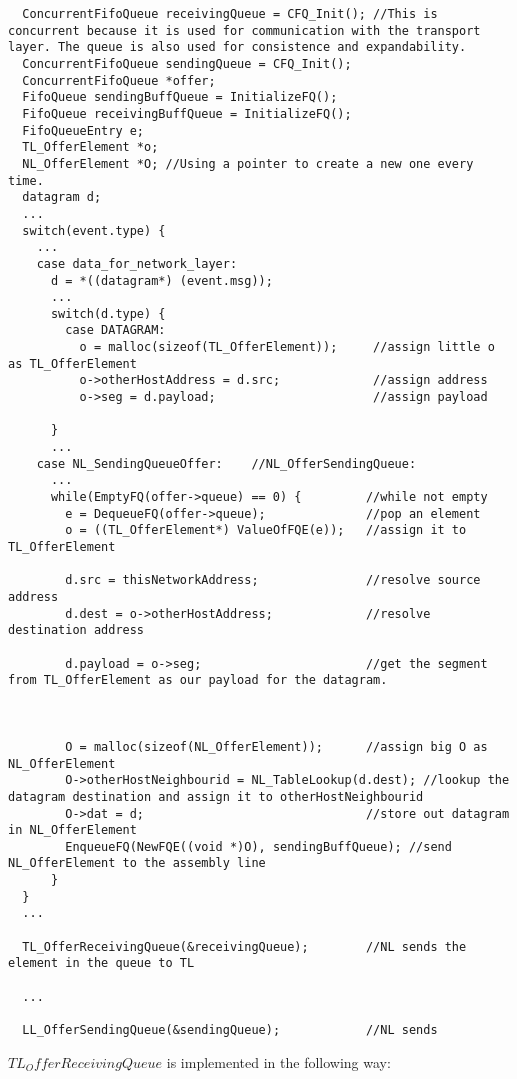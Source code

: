 \begin{lstlisting}
  ConcurrentFifoQueue receivingQueue = CFQ_Init(); //This is concurrent because it is used for communication with the transport layer. The queue is also used for consistence and expandability.
  ConcurrentFifoQueue sendingQueue = CFQ_Init();
  ConcurrentFifoQueue *offer;
  FifoQueue sendingBuffQueue = InitializeFQ();
  FifoQueue receivingBuffQueue = InitializeFQ();
  FifoQueueEntry e;
  TL_OfferElement *o;
  NL_OfferElement *O; //Using a pointer to create a new one every time.
  datagram d;
  ...
  switch(event.type) {
    ...
    case data_for_network_layer:
      d = *((datagram*) (event.msg));
      ...
      switch(d.type) {
        case DATAGRAM:
          o = malloc(sizeof(TL_OfferElement));     //assign little o as TL_OfferElement
          o->otherHostAddress = d.src;             //assign address
          o->seg = d.payload;                      //assign payload

      }
      ...
    case NL_SendingQueueOffer:    //NL_OfferSendingQueue:
      ...
      while(EmptyFQ(offer->queue) == 0) {         //while not empty
        e = DequeueFQ(offer->queue);              //pop an element
        o = ((TL_OfferElement*) ValueOfFQE(e));   //assign it to TL_OfferElement

        d.src = thisNetworkAddress;               //resolve source address
        d.dest = o->otherHostAddress;             //resolve destination address

        d.payload = o->seg;                       //get the segment from TL_OfferElement as our payload for the datagram.



        O = malloc(sizeof(NL_OfferElement));      //assign big O as NL_OfferElement
        O->otherHostNeighbourid = NL_TableLookup(d.dest); //lookup the datagram destination and assign it to otherHostNeighbourid
        O->dat = d;                               //store out datagram in NL_OfferElement
        EnqueueFQ(NewFQE((void *)O), sendingBuffQueue); //send NL_OfferElement to the assembly line
      }
  }
  ...

  TL_OfferReceivingQueue(&receivingQueue);        //NL sends the element in the queue to TL

  ...

  LL_OfferSendingQueue(&sendingQueue);            //NL sends
\end{lstlisting}


$TL_OfferReceivingQueue$ is implemented in the following way:

